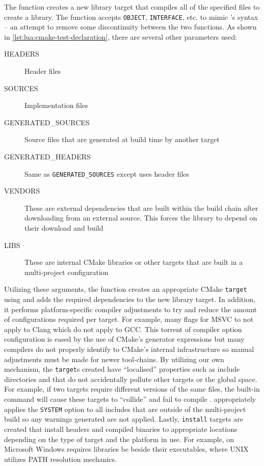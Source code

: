 The function  creates a new library target that compiles all of the specified files to create a library. The function accepts \texttt{OBJECT}, \texttt{INTERFACE}, etc. to mimic 's syntax \cite{CMake:add_library}  -- an attempt to remove some discontinuity between the two functions. As shown in \cref{lst:lua:cmake-test-declaration}, there are several other parameters used: 
\begin{description}
    \item[HEADERS] Header files
    \item[SOURCES] Implementation files
    \item[GENERATED\_SOURCES] Source files that are generated at build time by another target
    \item[GENERATED\_HEADERS] Same as \texttt{GENERATED\_SOURCES} except uses header files
    \item[VENDORS] These are external dependencies that are built within the build chain after downloading from an external source. This forces the library to depend on their download and build
    \item[LIBS] These are internal CMake libraries or other targets that are built in a multi-project configuration
\end{description}
Utilizing these arguments, the function creates an appropriate CMake \texttt{target} using  and adds the required dependencies to the new library target. In addition, it performs platform-specific compiler adjustments to try and reduce the amount of configurations required per target. For example, many flags for MSVC to not apply to Clang which do not apply to GCC. This torrent of compiler option configuration is eased by the use of CMake's generator expressions \cite{CMake:generator-expressions} but many compilers do not properly identify to CMake's internal infrastructure so manual adjustments must be made for newer tool-chains. By utilizing our own mechanism, the \texttt{target}s created have ``localised'' properties such as include directories and  that do not accidentally pollute other targets or the global space. For example, if two targets require different versions of the same files, the built-in  command will cause these targets to ``collide'' and fail to compile \cite{CMake:include-directories}.  appropriately applies the \texttt{SYSTEM} option to all includes that are outside of the multi-project build so any warnings generated are not applied. Lastly, \texttt{install} targets are created that install headers and compiled binaries to appropriate locations depending on the type of target and the platform in use. For example, on Microsoft Windows requires libraries be beside their executables, where UNIX utilizes PATH resolution mechanics.

